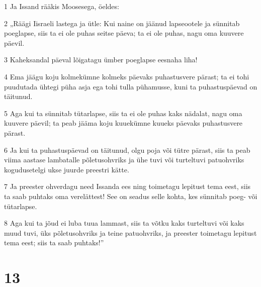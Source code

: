\par 1 Ja Issand rääkis Moosesega, öeldes:
\par 2 „Räägi Iisraeli lastega ja ütle: Kui naine on jäänud lapseootele ja sünnitab poeglapse, siis ta ei ole puhas seitse päeva; ta ei ole puhas, nagu oma kuuvere päevil.
\par 3 Kaheksandal päeval lõigatagu ümber poeglapse eesnaha liha!
\par 4 Ema jäägu koju kolmekümne kolmeks päevaks puhastusvere pärast; ta ei tohi puudutada ühtegi püha asja ega tohi tulla pühamusse, kuni ta puhastuspäevad on täitunud.
\par 5 Aga kui ta sünnitab tütarlapse, siis ta ei ole puhas kaks nädalat, nagu oma kuuvere päevil; ta peab jääma koju kuuekümne kuueks päevaks puhastusvere pärast.
\par 6 Ja kui ta puhastuspäevad on täitunud, olgu poja või tütre pärast, siis ta peab viima aastase lambatalle põletusohvriks ja ühe tuvi või turteltuvi patuohvriks kogudusetelgi ukse juurde preestri kätte.
\par 7 Ja preester ohverdagu need Issanda ees ning toimetagu lepitust tema eest, siis ta saab puhtaks oma verelättest! See on seadus selle kohta, kes sünnitab poeg- või tütarlapse.
\par 8 Aga kui ta jõud ei luba tuua lammast, siis ta võtku kaks turteltuvi või kaks muud tuvi, üks põletusohvriks ja teine patuohvriks, ja preester toimetagu lepitust tema eest; siis ta saab puhtaks!”

\chapter{13}

